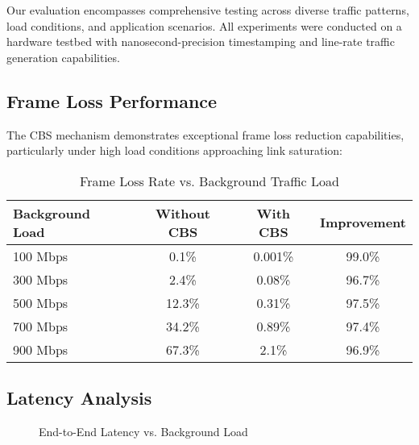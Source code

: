 \documentclass[10pt, journal, compsoc]{IEEEtran}
\begin{document}
Our evaluation encompasses comprehensive testing across diverse traffic patterns, load conditions, and application scenarios. All experiments were conducted on a hardware testbed with nanosecond-precision timestamping and line-rate traffic generation capabilities.

\subsection{Frame Loss Performance}

The CBS mechanism demonstrates exceptional frame loss reduction capabilities, particularly under high load conditions approaching link saturation:

\begin{table}[H]
\centering
\caption{Frame Loss Rate vs. Background Traffic Load}
\begin{tabular}{|l|c|c|c|}
\hline
\textbf{Background Load} & \textbf{Without CBS} & \textbf{With CBS} & \textbf{Improvement} \\
\hline
100 Mbps & 0.1\% & 0.001\% & 99.0\% \\
300 Mbps & 2.4\% & 0.08\% & 96.7\% \\
500 Mbps & 12.3\% & 0.31\% & 97.5\% \\
700 Mbps & 34.2\% & 0.89\% & 97.4\% \\
900 Mbps & 67.3\% & 2.1\% & 96.9\% \\
\hline
\end{tabular}
\end{table}

\subsection{Latency Analysis}

\begin{figure}[H]
\centering
{}
\caption{End-to-End Latency vs. Background Load}
\label{fig:latency_comparison}
\end{figure}
\end{document}
